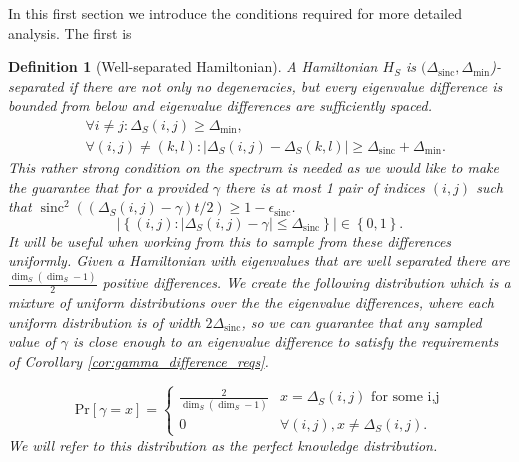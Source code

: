 \documentclass{article}
\newtheorem{definition}{Definition}
\newcommand{\abs}[1]{\left| #1 \right|}
\newcommand{\set}[1]{\left\{ #1 \right\}}
\newcommand{\prob}[1]{\text{Pr}\left[ #1 \right]}
\DeclareMathOperator{\sinc}{sinc}
\begin{document}
In this first section we introduce the conditions required for more detailed analysis. The first is 
\begin{definition}[Well-separated Hamiltonian] \label{def:separated_hamiltonians}
    A Hamiltonian $H_S$ is $(\Delta_{\sinc}, \Delta_{\min}$)-separated if there are not only no degeneracies, but every eigenvalue difference is bounded from below and eigenvalue differences are sufficiently spaced.
    \begin{align}
        &\forall i \neq j : \Delta_{S}(i,j) \geq \Delta_{\min}, \\
        &\forall (i,j) \neq (k,l) : \abs{\Delta_S(i,j) - \Delta_S(k,l)} \geq \Delta_{\sinc} + \Delta_{\min}.
    \end{align}
    This rather strong condition on the spectrum is needed as we would like to make the guarantee that for a provided $\gamma$ there is at most 1 pair of indices $(i,j)$ such that $\sinc^2((\Delta_S(i,j) - \gamma)t/2) \geq 1 - \epsilon_{\sinc}$.
    \begin{equation}
        \abs{\set{(i,j): \abs{\Delta_S(i,j) - \gamma} \leq \Delta_{\sinc}}} \in \set{0, 1}.
    \end{equation}
    It will be useful when working from this to sample from these differences uniformly. Given a Hamiltonian with eigenvalues that are well separated there are $\frac{\dim_S (\dim_S - 1)}{2}$ positive differences. We create the following distribution which is a mixture of uniform distributions over the the eigenvalue differences, where each uniform distribution is of width $2 \Delta_{\sinc}$, so we can guarantee that any sampled value of $\gamma$ is close enough to an eigenvalue difference to satisfy the requirements of Corollary \ref{cor:gamma_difference_reqs}.

    \begin{equation}
        \prob{\gamma = x} = \begin{cases}
            \frac{2}{\dim_S (\dim_S - 1)}
            & x = \Delta_S(i,j) \text{ for some i,j} \\
            0 & \forall (i,j), x \neq \Delta_S(i,j).
        \end{cases}
    \end{equation}
    We will refer to this distribution as the \emph{perfect knowledge} distribution.
\end{definition}
\end{document}
